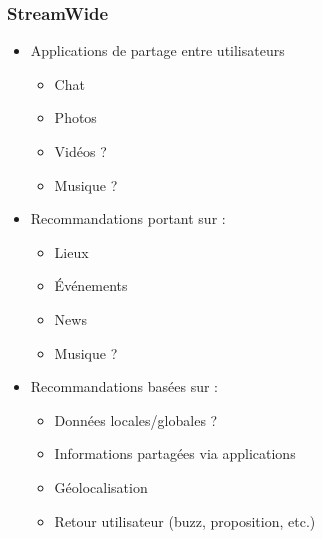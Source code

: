 \documentclass[11pt,sans]{beamer}
\begin{document}
\begin{frame}
        \frametitle{StreamWide}

        \begin{itemize}
            \item Applications de partage entre utilisateurs
                \begin{itemize}
                    \item Chat
                    \item Photos
                    \item Vid\'eos ?
                    \item Musique ?
                \end{itemize}
            \item Recommandations portant sur :
                \begin{itemize}
                    \item Lieux
                    \item \'Ev\'enements
                    \item News
                    \item Musique ?
                \end{itemize}
            \item Recommandations bas\'ees sur :
                \begin{itemize}
                    \item Donn\'ees locales/globales ?
                    \item Informations partag\'ees via applications
                    \item G\'eolocalisation
                    \item Retour utilisateur (buzz, proposition, etc.)
                \end{itemize}
        \end{itemize}
    \end{frame}
\end{document}
